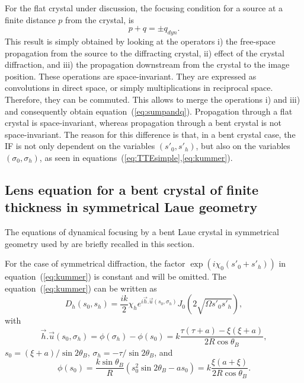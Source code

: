 \documentclass[preprint]{iucr}              %
\begin{document}
For the flat crystal under discussion, the focusing condition for a source at a finite distance $p$ from the crystal, is 
\begin{equation}
    \label{eq:sumpandq}
    p+q=\pm q_{dyn}.
\end{equation}
This result is simply obtained by looking at the operators i) the free-space propagation from the source to the diffracting crystal, ii) effect of the crystal diffraction, and iii) the propagation downstream from the crystal to the image position. These operations  are space-invariant. They are expressed as convolutions in direct space, or simply multiplications in reciprocal space. Therefore, they can be commuted. This allows to merge the operations i) and iii) and consequently obtain equation~(\ref{eq:sumpandq}).
Propagation through a flat crystal is space-invariant, whereas propagation through a bent crystal is not space-invariant. The reason for this difference is that, in a bent crystal case, the IF is not only dependent on the variables $(s'_0,s'_h)$, but also on the variables $(\sigma_0,\sigma_h)$, as seen in equations~(\ref{eq:TTEsimple},\ref{eq:kummer}).



\subsection{Lens equation for a bent crystal of finite thickness in symmetrical Laue geometry}
\label{sec:LaueNewCLE}

The equations of dynamical focusing by a bent Laue crystal in symmetrical geometry used by \cite{GuigayFerrero2016} are briefly recalled in this section.

For the case of symmetrical diffraction, the factor $\exp(i \chi_0(s'_0+s'_h))$ in equation~(\ref{eq:kummer}) is constant and will be omitted.
The equation~(\ref{eq:kummer}) can be written as
\begin{equation}
\label{eq:DhSymmetricalLaue}
    D_h(s_0,s_h) = \frac{i k}{2} \chi_h e^{i \vec h . \vec u(s_0,\sigma_h)}
    J_0(2\sqrt{\Omega s'_0 s'_h}),
\end{equation}
with 
\begin{equation}
\vec h . \vec u (s_0,\sigma_h) = \phi(\sigma_h)-\phi(s_0) =
k \frac{\tau(\tau+a)-\xi(\xi+a)}{2 R \cos\theta_B}, 
\end{equation}
$s_0=(\xi+  a)/\sin2\theta_B$,
$\sigma_h=-\tau/\sin2\theta_B$, and
\begin{equation}
\phi(s_0)=\frac{k \sin\theta_B}{R}(s_0^2 \sin2\theta_B - a s_0)=k \frac{\xi(a+\xi)}{2R\cos\theta_B}. 
\end{equation}
\end{document}
